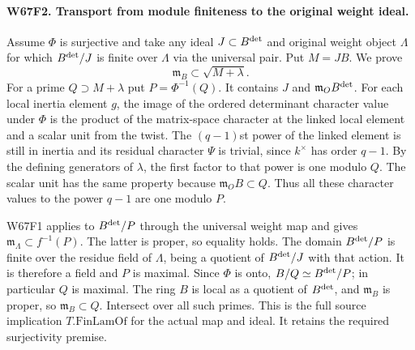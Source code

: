 \paragraph{W67F2. Transport from module finiteness to the original weight ideal.}
Assume $\Phi$ is surjective and take any ideal $J\subset B^{\rm det}$
and original weight object $\Lambda$ for which $B^{\rm det}/J$
is finite over $\Lambda$ via the universal pair. Put $M=JB$.
We prove
\[
                 \mathfrak m_B\subset\sqrt{M+\lambda}.
\]
For a prime $Q\supset M+\lambda$ put $P=\Phi^{-1}(Q)$. It
contains $J$ and $\mathfrak m_OB^{\rm det}$. For each local inertia
element $g$, the image of the ordered determinant character value
under $\Phi$ is the product of the matrix-space character at the
linked local element and a scalar unit from the twist. The
$(q-1)$st power of the linked element is still in inertia and its
residual character $\Psi$ is trivial, since $k^\times$ has order
$q-1$. By the defining generators of $\lambda$, the first factor
to that power is one modulo $Q$. The scalar unit has the same
property because $\mathfrak m_O B\subset Q$. Thus all these
character values to the power $q-1$ are one modulo $P$.

W67F1 applies to $B^{\rm det}/P$ through the universal weight map
and gives $\mathfrak m_\Lambda\subset f^{-1}(P)$. The latter is
proper, so equality holds. The domain $B^{\rm det}/P$ is finite
over the residue field of $\Lambda$, being a quotient of
$B^{\rm det}/J$ with that action. It is therefore a field and
$P$ is maximal. Since $\Phi$ is onto, $B/Q\simeq B^{\rm det}/P$;
in particular $Q$ is maximal. The ring $B$ is local as a quotient
of $B^{\rm det}$, and $\mathfrak m_B$ is proper, so
$\mathfrak m_B\subset Q$. Intersect over all such primes. This is
the full source implication $T.\mathrm{FinLamOf}$ for the actual
map and ideal. It retains the required surjectivity premise.

